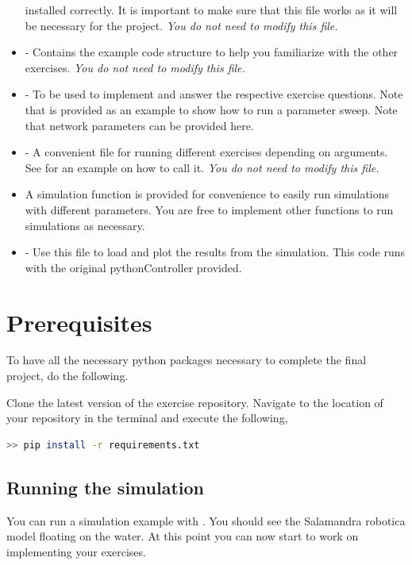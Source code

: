 \documentclass{cmc}
\begin{document}
\begin{itemize}
  installed correctly. It is important to make sure that this file works as it
  will be necessary for the project. \textit{You do not need to modify this
    file.}
\item {} - Contains the example code structure
  to help you familiarize with the other exercises. \textit{You do not need to
    modify this file.}
\item {} - To be used to implement and answer the
  respective exercise questions. Note that  is
  provided as an example to show how to run a parameter sweep. Note that network
  parameters can be provided here.
\item {} - A convenient file for running different
  exercises depending on arguments. See  for an example
  on how to call it. \textit{You do not need to modify this file.}
\item {} A simulation function is provided for
  convenience to easily run simulations with different parameters. You are free
  to implement other functions to run simulations as necessary.
\item {} - Use this file to load and plot the
  results from the simulation. This code runs with the original pythonController
  provided.
\end{itemize}


\section*{Prerequisites}
To have all the necessary python packages necessary to complete the
final project, do the following.

Clone the latest version of the exercise repository. Navigate to the
location of your repository in the terminal and execute the following,

\begin{lstlisting}[language=Bash]
  >> pip install -r requirements.txt
\end{lstlisting}

\subsection*{Running the simulation}
You can run a simulation example with . You
should see the Salamandra robotica model floating on the water. At this point
you can now start to work on implementing your exercises.
\end{document}
